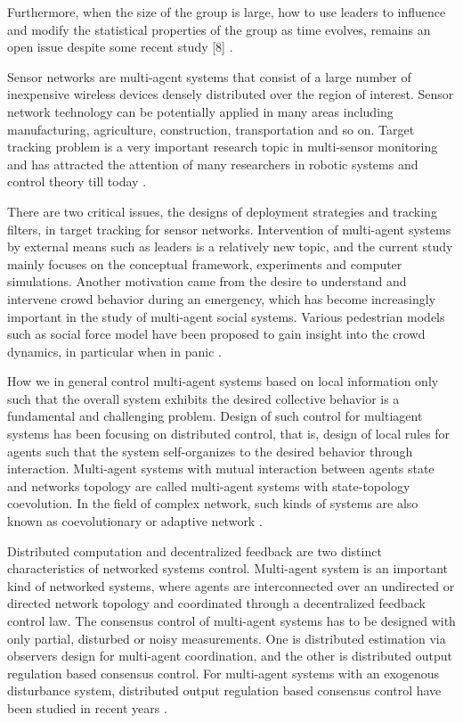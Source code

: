 \documentclass[letterpaper, 10 pt, conference]{ieeeconf}  %
\begin{document}
Furthermore, when the size of the group is large, how to use leaders to influence and modify the statistical properties of the group as time evolves, remains an open issue despite some recent study [8] \cite{jiang2013estimation}.


Sensor networks are multi-agent systems that consist of a large number of inexpensive wireless devices densely distributed over the region of interest. Sensor network technology can be potentially applied in many areas including manufacturing, agriculture, construction, transportation and so on.
Target tracking problem is a very important research topic in multi-sensor monitoring and has attracted the attention of many researchers in robotic systems and control theory till today \cite{jiang2013estimation}.

There are two critical issues, the designs of deployment strategies and tracking filters, in target tracking for sensor networks. Intervention of multi-agent systems by external means such as leaders is a relatively new topic, and the current study mainly focuses on the conceptual framework, experiments and computer simulations. Another motivation came from the desire to understand and intervene crowd behavior during an emergency, which has become increasingly important in the study of multi-agent social systems. Various pedestrian models such as social force model have been proposed to gain insight into the crowd dynamics, in particular when in panic \cite{jiang2013estimation}.

How we in general control multi-agent systems based on local information only such that the overall system exhibits the desired collective behavior is a fundamental and challenging problem. Design of such control for multiagent systems has been focusing on distributed control, that is, design of local rules for agents such that the system self-organizes to the desired behavior through interaction. Multi-agent systems with mutual interaction between agents state and networks topology are called multi-agent systems with state-topology coevolution. In the field of complex network, such kinds of systems are also known as coevolutionary or adaptive network \cite{jiang2013estimation}.

Distributed computation and decentralized feedback are two distinct characteristics of networked systems control. Multi-agent system is an important kind of networked systems, where agents are interconnected over an undirected or directed network topology and coordinated through a decentralized feedback control law. The consensus control of multi-agent systems has to be designed with only partial, disturbed or noisy measurements. One is distributed estimation via observers design for multi-agent coordination, and the other is distributed output regulation based consensus control. For multi-agent systems with an exogenous disturbance system, distributed output regulation based consensus control have been studied in recent years \cite{jiang2013estimation}.
\end{document}
